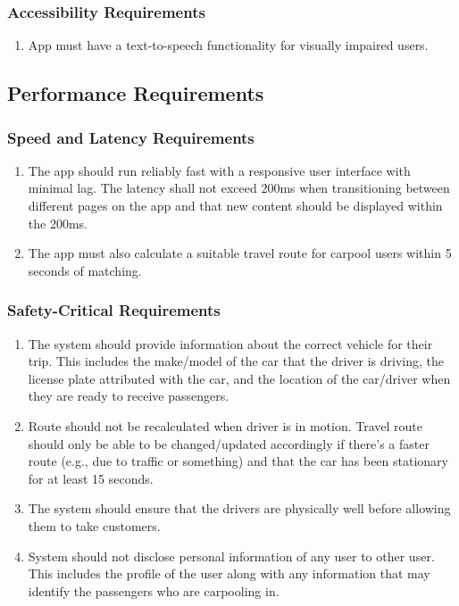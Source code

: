 \documentclass[]{article}
\begin{document}
\subsubsection{Accessibility Requirements}
\label{ssub:accessibility_requirements}
\begin{enumerate}[{UH-A}1. ]
	\item App must have a text-to-speech functionality for visually impaired users.
\end{enumerate}


\subsection{Performance Requirements}
\label{sub:performance_requirements}

\subsubsection{Speed and Latency Requirements}
\label{ssub:speed_and_latency_requirements}
\begin{enumerate}[{PR-SL}1. ]
	\item The app should run reliably fast with a responsive user interface with minimal lag. The latency shall not exceed 200ms when transitioning between different pages on the app and that new content should be displayed within the 200ms.
	\item The app must also calculate a suitable travel route for carpool users within 5 seconds of matching.
\end{enumerate}

\subsubsection{Safety-Critical Requirements}
\label{ssub:safety_critical_requirements}
\begin{enumerate}[{PR-SC}1. ]
	\item The system should provide information about the correct vehicle for their trip. This includes the make/model of the car that the driver is driving, the license plate attributed with the car, and the location of the car/driver when they are ready to receive passengers.
	\item Route should not be recalculated when driver is in motion. Travel route should only be able to be changed/updated accordingly if there’s a faster route (e.g., due to traffic or something) and that the car has been stationary for at least 15 seconds.
	\item The system should ensure that the drivers are physically well before allowing them to take customers.
	\item System should not disclose personal information of any user to other user. This includes the profile of the user along with any information that may identify the passengers who are carpooling in.
\end{enumerate}
\end{document}
